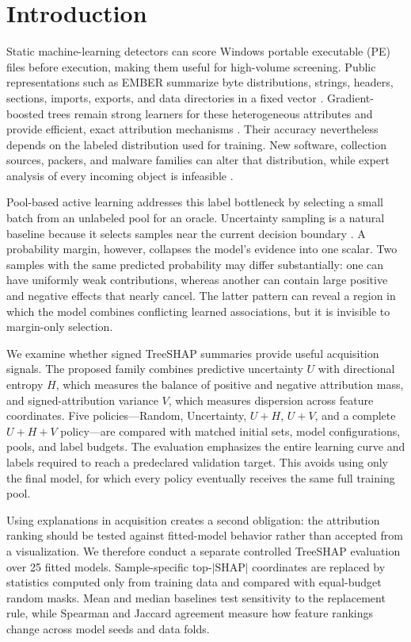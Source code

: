 \section{Introduction}
\label{sec:introduction}

Static machine-learning detectors can score Windows portable executable (PE)
files before execution, making them useful for high-volume screening. Public
representations such as EMBER summarize byte distributions, strings, headers,
sections, imports, exports, and data directories in a fixed vector
\cite{anderson2018ember}. Gradient-boosted trees remain strong learners for these
heterogeneous attributes and provide efficient, exact attribution mechanisms
\cite{ke2017lightgbm,lundberg2020local}. Their accuracy nevertheless depends on
the labeled distribution used for training. New software, collection sources,
packers, and malware families can alter that distribution, while expert analysis
of every incoming object is infeasible \cite{ucci2019survey,gibert2020rise,
arp2022dos}.

Pool-based active learning addresses this label bottleneck by selecting a small
batch from an unlabeled pool for an oracle. Uncertainty sampling is a natural
baseline because it selects samples near the current decision boundary
\cite{cohn1996active,settles2009active}. A probability margin, however, collapses
the model's evidence into one scalar. Two samples with the same predicted
probability may differ substantially: one can have uniformly weak contributions,
whereas another can contain large positive and negative effects that nearly
cancel. The latter pattern can reveal a region in which the model combines
conflicting learned associations, but it is invisible to margin-only selection.

We examine whether signed TreeSHAP summaries provide useful acquisition signals.
The proposed family combines predictive uncertainty $U$ with directional entropy
$H$, which measures the balance of positive and negative attribution mass, and
signed-attribution variance $V$, which measures dispersion across feature
coordinates. Five policies---Random, Uncertainty, $U+H$, $U+V$, and a complete
$U+H+V$ policy---are compared with matched initial sets, model configurations,
pools, and label budgets. The evaluation emphasizes the entire learning curve
and labels required to reach a predeclared validation target. This avoids using
only the final model, for which every policy eventually receives the same full
training pool.

Using explanations in acquisition creates a second obligation: the attribution
ranking should be tested against fitted-model behavior rather than accepted from
a visualization. We therefore conduct a separate controlled TreeSHAP evaluation
over 25 fitted models. Sample-specific top-$|\mathrm{SHAP}|$ coordinates are
replaced by statistics computed only from training data and compared with
equal-budget random masks. Mean and median baselines test sensitivity to the
replacement rule, while Spearman and Jaccard agreement measure how feature
rankings change across model seeds and data folds.

